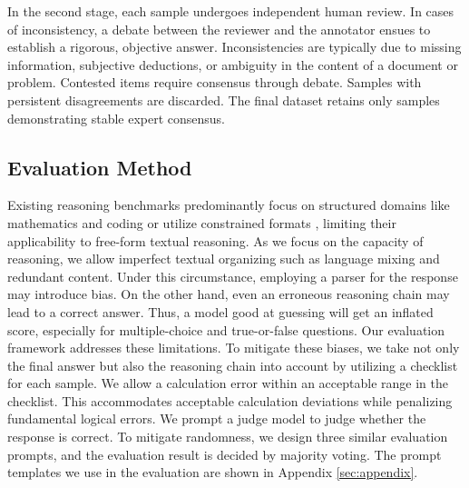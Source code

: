 In the second stage, each sample undergoes independent human review. 
In cases of inconsistency, a debate between the reviewer and the annotator ensues to establish a rigorous, objective answer. 
Inconsistencies are typically due to missing information, subjective deductions, or ambiguity in the content of a document or problem. 
Contested items require consensus through debate. 
Samples with persistent disagreements are discarded.
The final dataset retains only samples demonstrating stable expert consensus.


\subsection{Evaluation Method}\label{subsec:eval_method} 
Existing reasoning benchmarks predominantly focus on structured domains like mathematics and coding \cite{lightman2023lets, jain2024livecodebenchholisticcontaminationfree} or utilize constrained formats \cite{LongBench2}, limiting their applicability to free-form textual reasoning.
As we focus on the capacity of reasoning, we allow imperfect textual organizing such as language mixing and redundant content.
Under this circumstance, employing a parser for the response may introduce bias.
On the other hand, even an erroneous reasoning chain may lead to a correct answer.
Thus, a model good at guessing will get an inflated score, especially for multiple-choice and true-or-false questions.
Our evaluation framework addresses these limitations.
To mitigate these biases, we take not only the final answer but also the reasoning chain into account by utilizing a checklist for each sample.
We allow a calculation error within an acceptable range in the checklist.
This accommodates acceptable calculation deviations while penalizing fundamental logical errors.
We prompt a judge model to judge whether the response is correct. 
To mitigate randomness, we design three similar evaluation prompts, and the evaluation result is decided by majority voting.
The prompt templates we use in the evaluation are shown in Appendix \ref{sec:appendix}.
